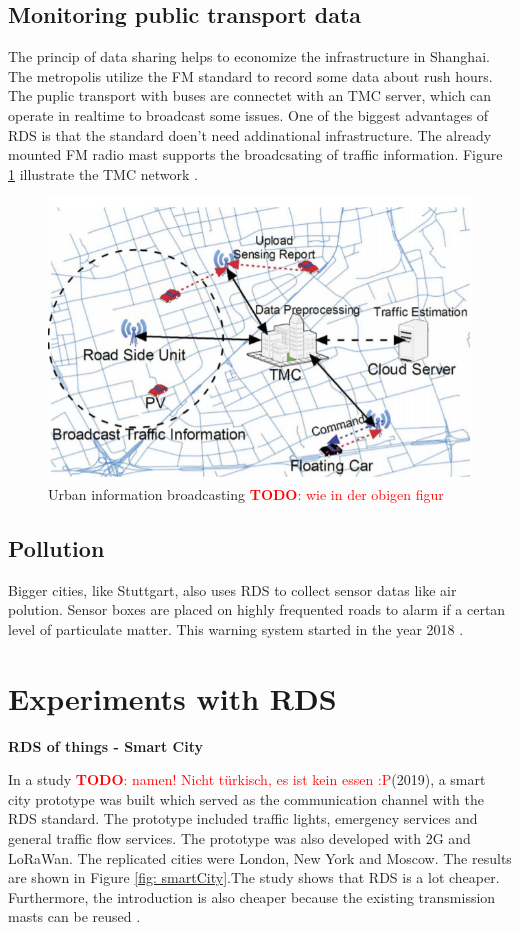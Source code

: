\documentclass[conference,11pt,a4paper]{IEEEtran}
\newcommand{\todo}[1]{\textcolor{red}{\textbf{TODO}: #1}}
\begin{document}
		
		\subsection{Monitoring public transport data}
		
		The princip of data sharing helps to economize the infrastructure in Shanghai. The metropolis utilize the FM standard to record some data about rush hours. The puplic transport with buses are connectet with an TMC server, which can operate in realtime to broadcast some issues. One of the biggest advantages of RDS is that the standard doen't need addinational infrastructure. The already mounted FM radio mast supports the broadcsating of traffic information. Figure \ref{fig: monitoring} illustrate the TMC network \cite{Monitoring-du2014effective}.

		\begin{figure}[h]
			\centering
			\includegraphics[width =0.5 \linewidth]{img/monitoring}
			\caption{Urban information broadcasting \todo{wie in der obigen figur}}
			\label{fig: monitoring}
		\end{figure}
	
	
		\subsection{Pollution}
	
		Bigger cities, like Stuttgart, also uses RDS to collect sensor datas like air polution. Sensor boxes are placed on highly frequented roads to alarm if a certan level of particulate matter. This warning system started in the year 2018 \cite{Stuttgart}.\\			 
		
		
	\section{Experiments with RDS} %
		\textbf{RDS of things - Smart City}
		
		In a study \todo{namen! Nicht türkisch, es ist kein essen :P}(2019), a smart city prototype was built which served as the communication channel with the RDS standard. The prototype included traffic lights, emergency services and general traffic flow services. The prototype was also developed with 2G and LoRaWan. The replicated cities were London, New York and Moscow. The results are shown in Figure \ref{fig: smartCity}.The study shows that RDS is a lot cheaper. Furthermore, the introduction is also cheaper because the existing transmission masts can be reused \cite{SmartCity-kutlay2019rds}.
			
\end{document}
